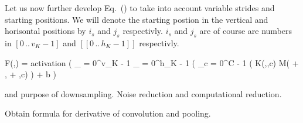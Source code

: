 Let us now further develop Eq.~() to take into account variable strides and starting positions.
We will denote the starting postion in the vertical and horisontal positions by $i_s$ and $j_s$ respectivly.
$i_s$ and $j_s$ are of course are numbers in $[0 \, .. \, v_K - 1]$ and $[[0 \, .. \, h_K - 1]]$ respectivly.

\startplaceformula[reference=devel-feature-5]
\startformula
F(\color[red]{x},\color[red]{y}) 
= {\rm activation} \left( 
\sum_{\color[blue]{i} = 0}^{v_K - 1}
\sum_{\color[blue]{j} = 0}^{h_K - 1} \left( 
\sum_{c = 0}^{C - 1} \Bigl( K(\color[blue]{i},\color[blue]{j},c) \cdot M(\color[red]{i} + \color[blue]{i}, \color[red]{j} + \color[blue]{j},c) \right)
+ b \right)
\stopformula
\stopplaceformula
\stopsubsubsection

\startsubsubsection[title=Zero padding]
\stopsubsubsection



 and purpose of downsampling.
Noise reduction and computational reduction.
\stopsubsection

\startsubsection[title=Backward Propagation]
Obtain formula for derivative of convolution and pooling.
\stopsubsection
\stopsection